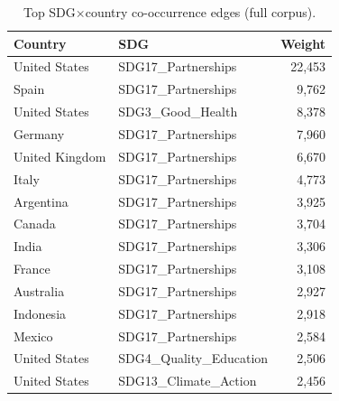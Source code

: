 \begin{table}[H]
\centering
\caption{Top SDG$\times$country co-occurrence edges (full corpus).}
\label{tab:top_edges}
\begin{tabular}{llr}
\toprule
Country & SDG & Weight \\
\midrule
United States & SDG17\_Partnerships & 22,453 \\
Spain & SDG17\_Partnerships & 9,762 \\
United States & SDG3\_Good\_Health & 8,378 \\
Germany & SDG17\_Partnerships & 7,960 \\
United Kingdom & SDG17\_Partnerships & 6,670 \\
Italy & SDG17\_Partnerships & 4,773 \\
Argentina & SDG17\_Partnerships & 3,925 \\
Canada & SDG17\_Partnerships & 3,704 \\
India & SDG17\_Partnerships & 3,306 \\
France & SDG17\_Partnerships & 3,108 \\
Australia & SDG17\_Partnerships & 2,927 \\
Indonesia & SDG17\_Partnerships & 2,918 \\
Mexico & SDG17\_Partnerships & 2,584 \\
United States & SDG4\_Quality\_Education & 2,506 \\
United States & SDG13\_Climate\_Action & 2,456 \\
\bottomrule
\end{tabular}
\end{table}
